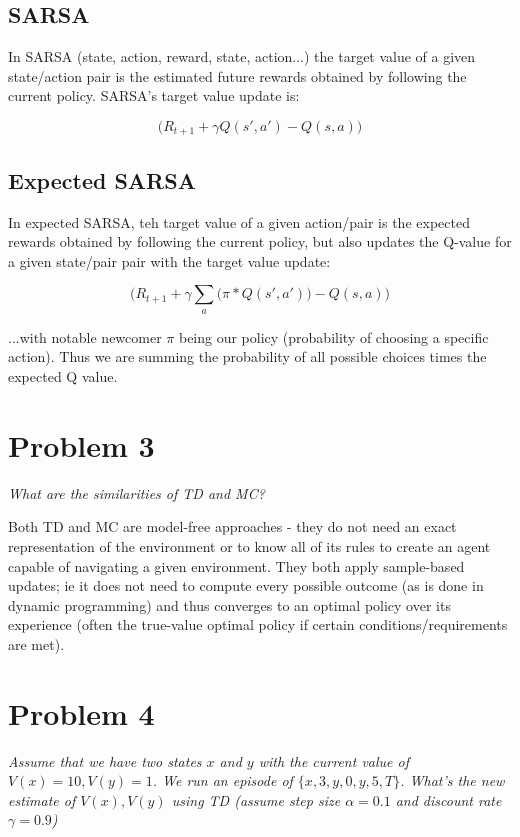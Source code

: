 \documentclass{article}
\begin{document}
\subsection*{SARSA}

In SARSA (state, action, reward, state, action...) the target value of a given state/action pair is the estimated future rewards obtained by following the current policy. SARSA's target value update is:

\begin{equation}
    \biggl( R_{t+1} + \gamma Q(s',a') - Q(s,a) \biggr)
\end{equation}

\subsection*{Expected SARSA}

In expected SARSA, teh target value of a given action/pair is the expected rewards  obtained by following the current policy, but also updates the Q-value for a given state/pair pair with the target value update:

\begin{equation}
    \biggl( R_{t+1} + \gamma \sum_a \bigl( \pi * Q(s',a') \bigr) - Q(s,a)  \biggr)
\end{equation}

\noindent ...with notable newcomer $\pi$ being our policy (probability of choosing a specific action). Thus we are summing the probability of all possible choices times the expected Q value.


\section*{Problem 3}
\textit{What are the similarities of TD and MC?}

Both TD and MC are model-free approaches - they do not need an exact representation of the environment or to know all of its rules to create an agent capable of navigating a given environment. They both apply sample-based updates; ie it does not need to compute every possible outcome (as is done in dynamic programming) and thus converges to an optimal policy over its experience (often the true-value optimal policy if certain conditions/requirements are met).

\section*{Problem 4}
\textit{Assume that we have two states $x$ and $y$ with the current value of $V(x)=10, V(y)=1$. We run an episode of $\{ x, 3, y, 0, y, 5, T \}$. What’s the new estimate of $V(x),V(y)$ using TD (assume step size $\alpha = 0.1$ and discount rate $\gamma = 0.9$)}
\end{document}
